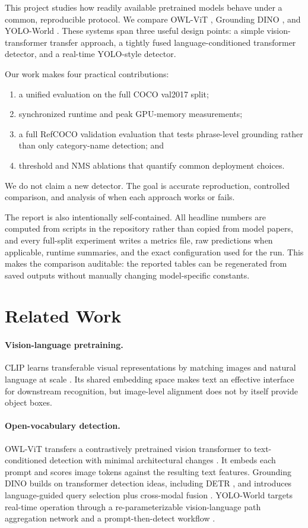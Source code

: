 \documentclass[conference]{IEEEtran}
\begin{document}
This project studies how readily available pretrained models behave under a
common, reproducible protocol. We compare OWL-ViT
\cite{minderer2022owlvit}, Grounding DINO \cite{liu2024groundingdino}, and
YOLO-World \cite{cheng2024yoloworld}. These systems span three useful design
points: a simple vision-transformer transfer approach, a tightly fused
language-conditioned transformer detector, and a real-time YOLO-style
detector.

Our work makes four practical contributions:
\begin{enumerate}
  \item a unified evaluation on the full COCO val2017 split;
  \item synchronized runtime and peak GPU-memory measurements;
  \item a full RefCOCO validation evaluation that tests phrase-level grounding
  rather than only category-name detection; and
  \item threshold and NMS ablations that quantify common deployment choices.
\end{enumerate}
We do not claim a new detector. The goal is accurate reproduction, controlled
comparison, and analysis of when each approach works or fails.

The report is also intentionally self-contained. All headline numbers are
computed from scripts in the repository rather than copied from model papers,
and every full-split experiment writes a metrics file, raw predictions when
applicable, runtime summaries, and the exact configuration used for the run.
This makes the comparison auditable: the reported tables can be regenerated
from saved outputs without manually changing model-specific constants.

\section{Related Work}

\paragraph{Vision-language pretraining.}
CLIP learns transferable visual representations by matching images and natural
language at scale \cite{radford2021clip}. Its shared embedding space makes text
an effective interface for downstream recognition, but image-level alignment
does not by itself provide object boxes.

\paragraph{Open-vocabulary detection.}
OWL-ViT transfers a contrastively pretrained vision transformer to
text-conditioned detection with minimal architectural changes
\cite{minderer2022owlvit}. It embeds each prompt and scores image tokens
against the resulting text features. Grounding DINO builds on transformer
detection ideas, including DETR \cite{carion2020detr}, and introduces
language-guided query selection plus cross-modal fusion
\cite{liu2024groundingdino}. YOLO-World targets real-time operation through a
re-parameterizable vision-language path aggregation network and a
prompt-then-detect workflow \cite{cheng2024yoloworld}.
\end{document}
